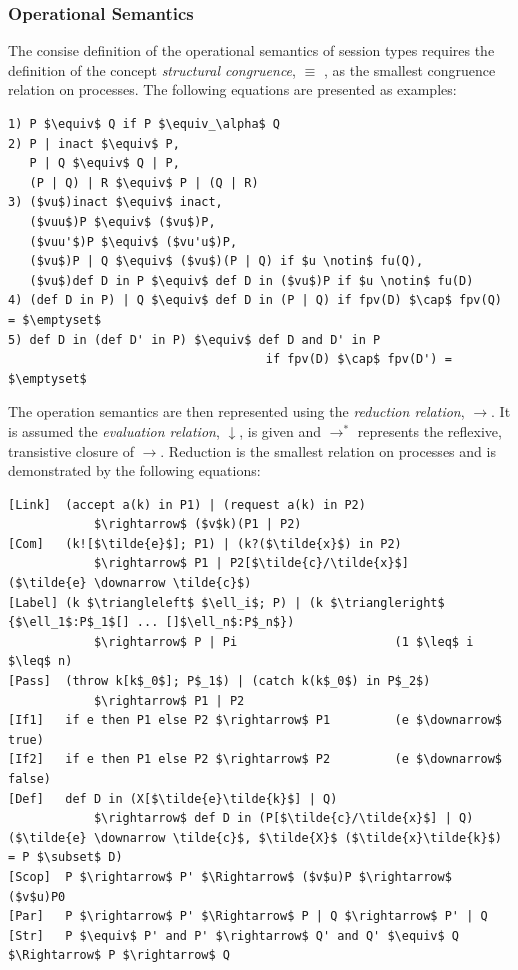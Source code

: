\documentclass[11pt]{scrartcl}
\begin{document}
\subsubsection{Operational Semantics}
The consise definition of the operational semantics of session types requires the 
definition of the concept \emph{structural congruence}, $\equiv$ \cite{BB92, M92},
as the smallest congruence relation on processes. The following equations are
presented as examples:
\\

\begin{lstlisting}
1) P $\equiv$ Q if P $\equiv_\alpha$ Q
2) P | inact $\equiv$ P, 
   P | Q $\equiv$ Q | P, 
   (P | Q) | R $\equiv$ P | (Q | R)
3) ($vu$)inact $\equiv$ inact, 
   ($vuu$)P $\equiv$ ($vu$)P, 
   ($vuu'$)P $\equiv$ ($vu'u$)P, 
   ($vu$)P | Q $\equiv$ ($vu$)(P | Q) if $u \notin$ fu(Q), 
   ($vu$)def D in P $\equiv$ def D in ($vu$)P if $u \notin$ fu(D)
4) (def D in P) | Q $\equiv$ def D in (P | Q) if fpv(D) $\cap$ fpv(Q) = $\emptyset$
5) def D in (def D' in P) $\equiv$ def D and D' in P 
                                    if fpv(D) $\cap$ fpv(D') = $\emptyset$
\end{lstlisting} 

The operation semantics are then represented using the \emph{reduction relation}, 
$\rightarrow$. It is assumed the \emph{evaluation relation}, $\downarrow$, 
is given and $\rightarrow^*$ represents the reflexive, transistive closure of 
$\rightarrow$. Reduction is the smallest relation on processes and is demonstrated 
by the following equations:
\\

\begin{lstlisting}
[Link]  (accept a(k) in P1) | (request a(k) in P2) 
            $\rightarrow$ ($v$k)(P1 | P2)
[Com]   (k![$\tilde{e}$]; P1) | (k?($\tilde{x}$) in P2) 
            $\rightarrow$ P1 | P2[$\tilde{c}/\tilde{x}$]                   ($\tilde{e} \downarrow \tilde{c}$)
[Label] (k $\triangleleft$ $\ell_i$; P) | (k $\triangleright$ {$\ell_1$:P$_1$[] ... []$\ell_n$:P$_n$}) 
            $\rightarrow$ P | Pi                      (1 $\leq$ i $\leq$ n)
[Pass]  (throw k[k$_0$]; P$_1$) | (catch k(k$_0$) in P$_2$) 
            $\rightarrow$ P1 | P2
[If1]   if e then P1 else P2 $\rightarrow$ P1         (e $\downarrow$ true)
[If2]   if e then P1 else P2 $\rightarrow$ P2         (e $\downarrow$ false)
[Def]   def D in (X[$\tilde{e}\tilde{k}$] | Q) 
            $\rightarrow$ def D in (P[$\tilde{c}/\tilde{x}$] | Q)          ($\tilde{e} \downarrow \tilde{c}$, $\tilde{X}$ ($\tilde{x}\tilde{k}$) = P $\subset$ D)
[Scop]  P $\rightarrow$ P' $\Rightarrow$ ($v$u)P $\rightarrow$ ($v$u)P0
[Par]   P $\rightarrow$ P' $\Rightarrow$ P | Q $\rightarrow$ P' | Q
[Str]   P $\equiv$ P' and P' $\rightarrow$ Q' and Q' $\equiv$ Q $\Rightarrow$ P $\rightarrow$ Q
\end{lstlisting}
\end{document}
